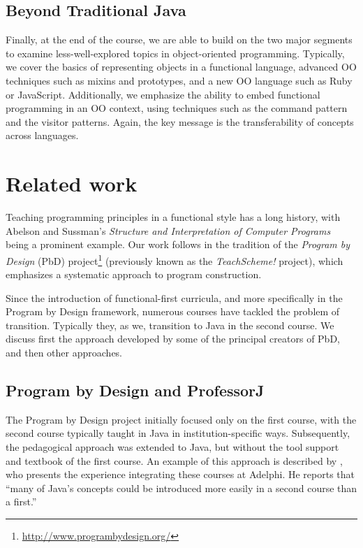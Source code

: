 \documentclass[submission,copyright]{eptcs}
\begin{document}
\subsection{Beyond Traditional Java}

Finally, at the end of the course, we are able to build on the two
major segments to examine less-well-explored topics in object-oriented
programming.  Typically, we cover the basics of representing objects
in a functional language, advanced OO techniques such as mixins and
prototypes, and a new OO language such as Ruby or JavaScript.
Additionally, we emphasize the ability to embed functional programming
in an OO context, using techniques such as the command pattern and the
visitor patterns.  Again, the key message is the transferability of
concepts across languages.



\section{Related work}
\label{sec:related-work}

Teaching programming principles in a functional style has a long
history, with Abelson and Sussman's \emph{Structure and Interpretation
  of Computer Programs}~\cite{dvanhorn:sicp} being a prominent
example.  Our work follows in the tradition of the \emph{Program by
  Design} (PbD)
project\footnote{\url{http://www.programbydesign.org/}} (previously
known as the \emph{TeachScheme!} project), which emphasizes a
systematic approach to program construction.

Since the introduction of functional-first curricula, and more
specifically in the Program by Design framework, numerous courses have
tackled the problem of transition.  Typically they, as we, transition
to Java in the second course.  We discuss first the approach developed
by some of the principal creators of PbD, and then other approaches.

\subsection{Program by Design and ProfessorJ}

The Program by Design project initially focused only on the first course,
with the second course typically taught in Java in
institution-specific ways. Subsequently, the pedagogical approach was
extended to Java, but without the tool support and textbook of the
first course.  An example of this approach is described by
\citet{dvanhorn:Bloch2000Scheme}, who presents the experience
integrating these courses at Adelphi.  He reports that ``many of
Java's concepts could be introduced more easily in a second course
than a first.''
\end{document}
